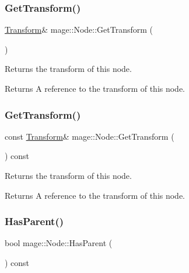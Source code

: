 \subsubsection{\texorpdfstring{Get\+Transform()}{GetTransform()}\hspace{0.1cm}{\footnotesize\ttfamily [1/2]}}
{\footnotesize\ttfamily \mbox{\hyperlink{classmage_1_1_transform}{Transform}}\& mage\+::\+Node\+::\+Get\+Transform (\begin{DoxyParamCaption}{ }\end{DoxyParamCaption})\hspace{0.3cm}{\ttfamily [noexcept]}}

Returns the transform of this node.

\begin{DoxyReturn}{Returns}
A reference to the transform of this node. 
\end{DoxyReturn}
\mbox{\label{classmage_1_1_node_aa8e2a3e9361dbdb4be23a8986f4ef082}} 
\subsubsection{\texorpdfstring{Get\+Transform()}{GetTransform()}\hspace{0.1cm}{\footnotesize\ttfamily [2/2]}}
{\footnotesize\ttfamily const \mbox{\hyperlink{classmage_1_1_transform}{Transform}}\& mage\+::\+Node\+::\+Get\+Transform (\begin{DoxyParamCaption}{ }\end{DoxyParamCaption}) const\hspace{0.3cm}{\ttfamily [noexcept]}}

Returns the transform of this node.

\begin{DoxyReturn}{Returns}
A reference to the transform of this node. 
\end{DoxyReturn}
\mbox{\label{classmage_1_1_node_a2c1fe63ec1cb15321f0b0f5879227dcd}} 
\subsubsection{\texorpdfstring{Has\+Parent()}{HasParent()}}
{\footnotesize\ttfamily bool mage\+::\+Node\+::\+Has\+Parent (\begin{DoxyParamCaption}{ }\end{DoxyParamCaption}) const\hspace{0.3cm}{\ttfamily [noexcept]}}

